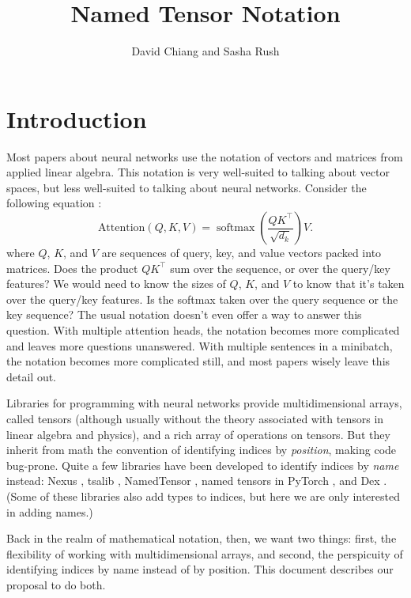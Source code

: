 \documentclass{article}
\title{Named Tensor Notation}
\author{David Chiang and Sasha Rush}
\DeclareMathOperator*{\softmax}{softmax}
\begin{document}
\maketitle

\tableofcontents

\section{Introduction}

Most papers about neural networks use the notation of vectors and matrices from applied linear algebra. This notation is very well-suited to talking about vector spaces, but less well-suited to talking about neural networks. Consider the following equation \citep{vaswani+:2017}:
\begin{equation}
  \text{Attention}(Q, K, V) = \softmax \left( \frac{QK^\top}{\sqrt{d_k}} \right) V. 
  \label{eq:attention-naive}
\end{equation} 
where $Q$, $K$, and $V$ are sequences of query, key, and value vectors packed into matrices. Does the product $QK^\top$ sum over the sequence, or over the query/key features? We would need to know the sizes of $Q$, $K$, and $V$ to know that it's taken over the query/key features. Is the softmax taken over the query sequence or the key sequence? The usual notation doesn't even offer a way to answer this question. With multiple attention heads, the notation becomes more complicated and leaves more questions unanswered. With multiple sentences in a minibatch, the notation becomes more complicated still, and most papers wisely leave this detail out.

Libraries for programming with neural networks \citep{numpy,pytorch} provide multidimensional arrays, called tensors (although usually without the theory associated with tensors in linear algebra and physics), and a rich array of operations on tensors. But they inherit from math the convention of identifying indices by \emph{position}, making code bug-prone. Quite a few libraries have been developed to identify indices by \emph{name} instead: Nexus \citep{chen2017typesafe}, tsalib \citep{tsalib}, NamedTensor \citep{namedtensor}, named tensors in PyTorch \citep{named-tensors}, and Dex \citep{maclaurin+:2019}. (Some of these libraries also add types to indices, but here we are only interested in adding names.)

Back in the realm of mathematical notation, then, we want two things: first, the flexibility of working with multidimensional arrays, and second, the perspicuity of identifying indices by name instead of by position. This document describes our proposal to do both.
\end{document}
